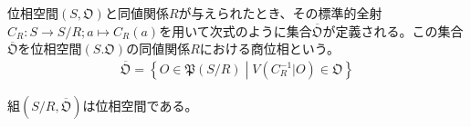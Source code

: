 \documentclass[dvipdfmx]{jsarticle}
\begin{document}

\begin{dfn}
位相空間$\left( S,\mathfrak{O} \right)$と同値関係$R$が与えられたとき、その標準的全射$C_{R}:S \rightarrow {S}/{R};a \mapsto C_{R}(a)$を用いて次式のように集合$\overline{\mathfrak{O}}$が定義される。この集合$\overline{\mathfrak{O}}$を位相空間$\left( S.\mathfrak{O} \right)$の同値関係$R$における商位相という。
\begin{align*}
\overline{\mathfrak{O}} = \left\{ O \in \mathfrak{P}\left( {S}/{R} \right) \middle| V\left( C_{R}^{- 1}|O \right)\in \mathfrak{O} \right\}
\end{align*}
\end{dfn}
\begin{thm}\label{8.1.4.33}
組$\left( {S}/{R},\overline{\mathfrak{O}} \right)$は位相空間である。
\end{thm}
\end{document}
